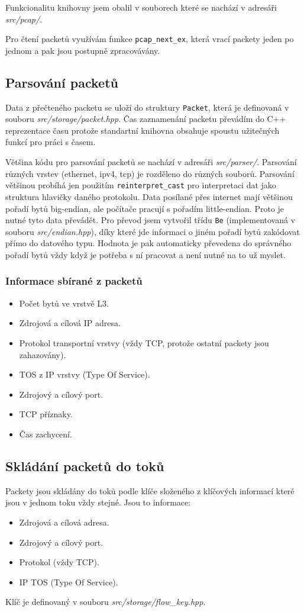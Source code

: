 \documentclass{article}
\begin{document}
Funkcionalitu knihovny jsem obalil v souborech které se nachází v adresáři
\textit{src/pcap/}.

Pro čtení packetů využívám funkce \verb|pcap_next_ex|, která vrací packety
jeden po jednom a pak jsou postupně zpracovávány.

\subsection{Parsování packetů}
Data z přečteného packetu se uloží do struktury \verb|Packet|, která je
definovaná v souboru \textit{src/storage/packet.hpp}. Čas zaznamenání packetu
převádím do C++ reprezentace času protože standartní knihovna obsahuje spoustu
užitečných funkcí pro práci s časem.

Většina kódu pro parsování packetů se nachází v adresáři \textit{src/parser/}.
Parsování různých vrstev (ethernet, ipv4, tcp) je rozděleno do různých souborů.
Parsování většinou probíhá jen použitím \verb|reinterpret_cast| pro
interpretaci dat jako struktura hlavičky daného protokolu. Data posílané přes
internet mají většinou pořadí bytů big-endian, ale počítače pracují s pořadím
little-endian. Proto je nutné tyto data převádět. Pro převod jsem vytvořil
třídu \verb|Be| (implementovaná v souboru \textit{src/endian.hpp}), díky které
jde informaci o jiném pořadí bytů zakódovat přímo do datového typu. Hodnota je
pak automaticky převedena do správného pořadí bytů vždy když je potřeba s ní
pracovat a není nutné na to už myslet.

\subsubsection{Informace sbírané z packetů}
\begin{itemize}
    \item Počet bytů ve vrstvě L3.
    \item Zdrojová a cílová IP adresa.
    \item Protokol transportní vrstvy (vždy TCP, protože ostatní packety jsou
          zahazovány).
    \item TOS z IP vrstvy (Type Of Service).
    \item Zdrojový a cílový port.
    \item TCP příznaky.
    \item Čas zachycení.
\end{itemize}

\subsection{Skládání packetů do toků}
Packety jsou skládány do toků podle klíče složeného z klíčových informací které
jsou v jednom toku vždy stejné. Jsou to informace:
\begin{itemize}
    \item Zdrojová a cílová adresa.
    \item Zdrojový a cílový port.
    \item Protokol (vždy TCP).
    \item IP TOS (Type Of Service).
\end{itemize}
Klíč je definovaný v souboru \textit{src/storage/flow\_key.hpp}.
\end{document}
